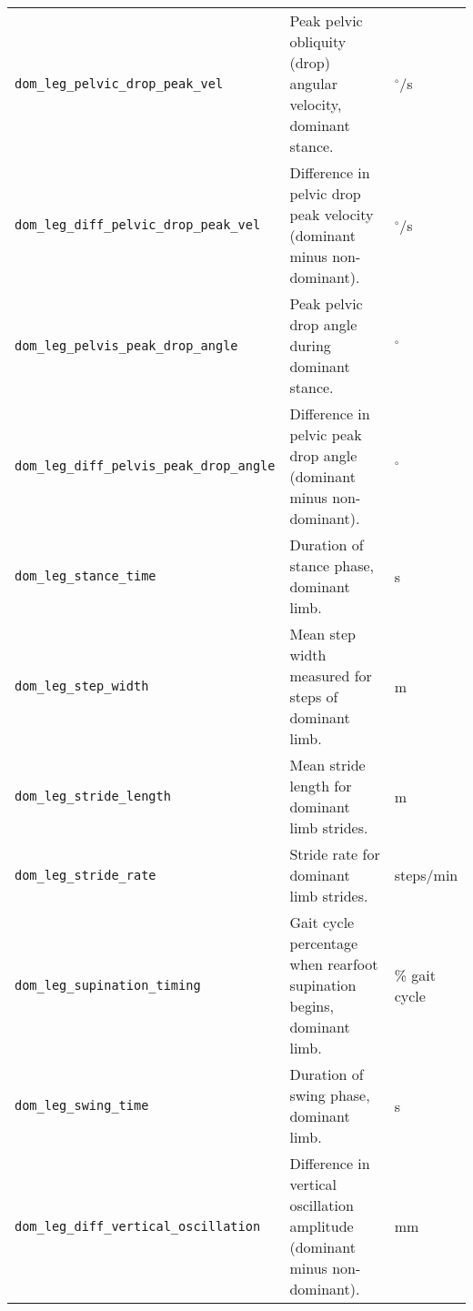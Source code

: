 {\begin{longtable}{@{}p{} p{} p{}@{}}
    \texttt{dom\_leg\_pelvic\_drop\_peak\_vel} & Peak pelvic obliquity (drop) angular velocity, dominant stance. & $^\circ$/s \\
    \texttt{dom\_leg\_diff\_pelvic\_drop\_peak\_vel} & Difference in pelvic drop peak velocity (dominant minus non-dominant). & $^\circ$/s \\
    \texttt{dom\_leg\_pelvis\_peak\_drop\_angle} & Peak pelvic drop angle during dominant stance. & $^\circ$ \\
    \texttt{dom\_leg\_diff\_pelvis\_peak\_drop\_angle} & Difference in pelvic peak drop angle (dominant minus non-dominant). & $^\circ$ \\
    \texttt{dom\_leg\_stance\_time} & Duration of stance phase, dominant limb. & s \\
    \texttt{dom\_leg\_step\_width} & Mean step width measured for steps of dominant limb. & m \\
    \texttt{dom\_leg\_stride\_length} & Mean stride length for dominant limb strides. & m \\
    \texttt{dom\_leg\_stride\_rate} & Stride rate for dominant limb strides. & steps/min \\
    \texttt{dom\_leg\_supination\_timing} & Gait cycle percentage when rearfoot supination begins, dominant limb. & \% gait cycle \\
    \texttt{dom\_leg\_swing\_time} & Duration of swing phase, dominant limb. & s \\
    \texttt{dom\_leg\_diff\_vertical\_oscillation} & Difference in vertical oscillation amplitude (dominant minus non-dominant). & mm \\
\end{longtable}
}
